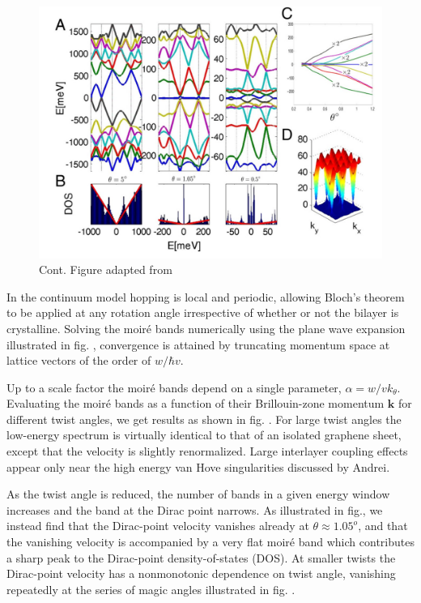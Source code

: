 \begin{figure}[H]
	\centering
	\includegraphics[width=\textwidth]{figures/contmodelband.jpg}
	\caption{Cont. Figure adapted from \cite{Bistritzer12233}}
	\label{fig:contmodelband}
\end{figure}

In the continuum model hopping is local and periodic, allowing Bloch’s theorem to be applied at any rotation angle irrespective of whether or not the bilayer is crystalline. Solving  the moiré bands numerically using the plane wave expansion illustrated in fig. , convergence is attained by truncating momentum space at lattice vectors of the order of $w/\hbar v$. 

Up to a scale factor the moiré bands depend on a single parameter, $\alpha=w/vk_\theta$. Evaluating the moiré bands as a function of their Brillouin-zone momentum $\mathbf{k}$ for different twist angles, we get results as shown in fig. . For large twist angles the low-energy spectrum is virtually identical to that of an isolated graphene sheet, except that the velocity is slightly renormalized. Large interlayer coupling effects appear only near the high energy van Hove singularities discussed by Andrei.

As the twist angle is reduced, the number of bands in a given energy window increases and the band at the Dirac point narrows. As illustrated in fig., we instead find that the Dirac-point velocity vanishes already at $\theta \approx 1.05^o$, and that the vanishing velocity is accompanied by a very flat moiré band which contributes a sharp peak to the Dirac-point density-of-states (DOS). At smaller twists the Dirac-point velocity has a nonmonotonic dependence on twist angle, vanishing repeatedly at the series of magic angles illustrated in fig. .

